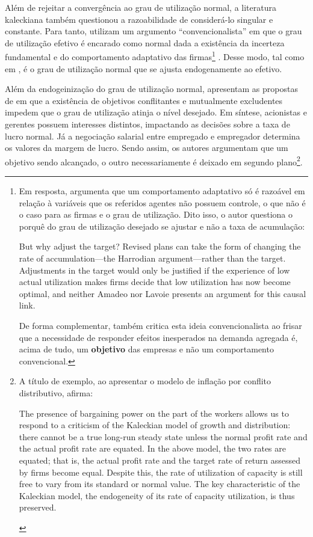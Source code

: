 Além de rejeitar a convergência ao grau de utilização normal, a literatura kaleckiana também questionou a razoabilidade de considerá-lo singular e constante. 
Para tanto, utilizam um argumento ``convencionalista'' em que o grau de utilização efetivo é encarado como normal dada a existência da incerteza fundamental e do comportamento adaptativo das firmas\footnote{
	Em resposta, \textcite{skott_theoretical_2012} argumenta que um comportamento adaptativo só é razoável em relação à variáveis que os referidos agentes não possuem controle, o que não é o caso para as firmas e o grau de utilização. Dito isso, o autor questiona o porquê do grau de utilização desejado se ajustar e não a taxa de acumulação:
	
	\begin{citacao}
		But why adjust the target? Revised plans can take the form of changing the rate of accumulation—the Harrodian argument—rather than the target. Adjustments in the target would only be justified if the experience of low actual utilization makes firms decide that low utilization has now become optimal, and neither Amadeo nor Lavoie presents an argument for this causal link. \cite[p.120]{skott_theoretical_2012}
	\end{citacao}
	De forma complementar, \textcite{nikiforos_utilization_2016} também critica esta ideia convencionalista ao frisar que a necessidade de responder efeitos inesperados na demanda agregada é, acima de tudo, um \textbf{objetivo} das empresas e não um comportamento convencional. 
} \cite{lavoie_kaleckian_1995}. Desse modo, tal como em \textcite{amadeo_role_1986}, é o grau de utilização normal que se ajusta endogenamente ao efetivo. 

Além da endogeinização do grau de utilização normal, \textcite{hein_harrodian_2012} apresentam as propostas de \textcite{dallery_conflicting_2011} em que a existência de objetivos conflitantes e mutualmente excludentes impedem que o grau de utilização atinja o nível desejado. Em síntese, acionistas e gerentes possuem interesses distintos, impactando as decisões sobre a taxa de lucro normal. Já a negociação salarial entre empregado e empregador determina os valores da margem de lucro. Sendo assim, os autores argumentam que um objetivo sendo alcançado, o outro necessariamente é deixado em segundo plano\footnote{
	A título de exemplo, ao apresentar o modelo de inflação por conflito distributivo, \textcite[p.~567]{lavoie_post-keynesian_2015} afirma:
	\begin{citacao}
		The presence of bargaining power on the part of the workers allows
		us to respond to a criticism of the Kaleckian model of growth and distribution: there
		cannot be a true long-run steady state unless the normal profit rate and the actual profit
		rate are equated. In the above model, the two rates are equated; that is, the actual profit
		rate and the target rate of return assessed by firms become equal. Despite this, the rate
		of utilization of capacity is still free to vary from its standard or normal value. The key
		characteristic of the Kaleckian model, the endogeneity of its rate of capacity utilization,
		is thus preserved.
	\end{citacao}
}.

